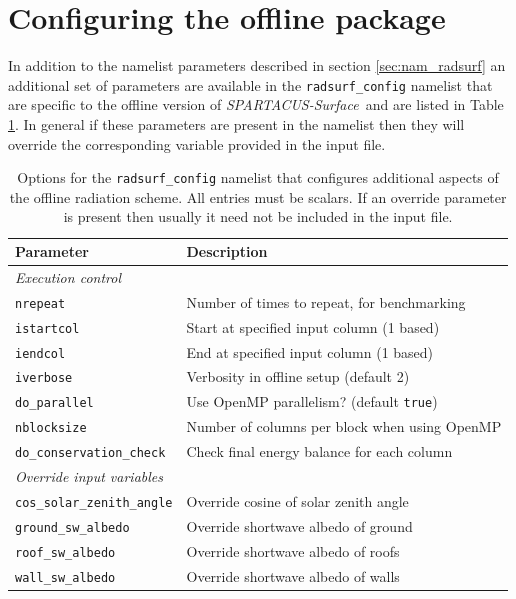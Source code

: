 \documentclass[a4,oneside]{article}
\def\tablesetup{\rowcolors{2}{light-gray}{light-gray}\footnotesize}
\def\codesize{\small}
\def\codetabsize{\footnotesize}
\def\spsurf{\emph{SPARTACUS-Surface}}
\def\code#1{{\codesize\texttt{#1}}}
\def\codetab#1{{\codetabsize\texttt{#1}}}
\begin{document}
\section{Configuring the offline package}
\label{sec:nam_radsurf_config}
In addition to the namelist parameters described in section
\ref{sec:nam_radsurf} an additional set of parameters are available in
the \code{radsurf\_config} namelist that are specific to the offline
version of \spsurf\ and are listed in Table
\ref{tab:nam_radsurf_config}. In general if these parameters are
present in the namelist then they will override the corresponding
variable provided in the input file.

\begin{center}
\tablesetup
\begin{longtable}{ll}
%
\caption{\label{tab:nam_radsurf_config}Options for the
  \code{radsurf\_config} namelist that configures additional aspects
  of the offline radiation scheme. All entries must be scalars. If an
  override parameter is present then usually it need not be included
  in the input file.}\\
%
\hline
Parameter & Description\\
\hline
\multicolumn{2}{l}{\emph{Execution control}}\\
\codetab{nrepeat}  & Number of times to repeat, for benchmarking\\
\codetab{istartcol} & Start at specified input column (1 based)\\
\codetab{iendcol} & End at specified input column (1 based)\\
\codetab{iverbose} & Verbosity in offline setup (default 2)\\
\codetab{do\_parallel} & Use OpenMP parallelism? (default \codetab{true})\\
\codetab{nblocksize} & Number of columns per block when using OpenMP\\
\codetab{do\_conservation\_check} & Check final energy balance for each column\\
\hline
\multicolumn{2}{l}{\emph{Override input variables}}\\
\codetab{cos\_solar\_zenith\_angle} & Override cosine of solar zenith angle\\
\codetab{ground\_sw\_albedo} & Override shortwave albedo of ground\\
\codetab{roof\_sw\_albedo} & Override shortwave albedo of roofs\\
\codetab{wall\_sw\_albedo} & Override shortwave albedo of walls\\

\end{longtable}
\end{center}
\end{document}
